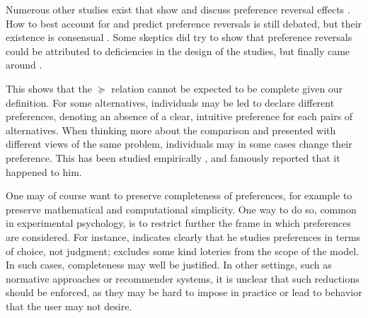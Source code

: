 \documentclass[french, english]{llncs}
\begin{document}
Numerous other studies exist that show and discuss preference reversal effects \citetext{\citealp[Ch. 2 (from which we took the two studies described here above)]{deparis_etude_2012}, \citealp{lichtenstein_construction_2006, tversky_causes_1990, kahneman_judgement_1981, kahneman_choices_2000}}. How to best account for and predict preference reversals is still debated, but their existence is consensual \citep{wakker_prospect_2010, birnbaum_empirical_2017}. Some skeptics did try to show that preference reversals could be attributed to deficiencies in the design of the studies, but finally came around \citep{slovic_preference_1983}.
	
This shows that the $\succeq$ relation cannot be expected to be complete given our definition. For some alternatives, individuals may be led to declare different preferences, denoting an absence of a clear, intuitive preference for each pairs of alternatives. When thinking more about the comparison and presented with different views of the same problem, individuals may in some cases change their preference. This has been studied empirically \citep{slovic_who_1974, maccrimmon_utility_1979, lichtenstein_reversals_2006}, and \citet[pp. 101–103]{savage_foundations_1972} famously reported that it happened to him.

One may of course want to preserve completeness of preferences, for example to preserve mathematical and computational simplicity. One way to do so, common in experimental psychology, is to restrict further the frame in which preferences are considered. For instance, \citet{luce_utility_2000} indicates clearly that he studies preferences in terms of choice, not judgment; \citet{maccrimmon_real_1980} excludes some kind loteries from the scope of the model. In such cases, completeness may well be justified. 
In other settings, such as normative approaches or recommender systems, it is unclear that such reductions should be enforced, as they may be hard to impose in practice or lead to behavior that the user may not desire. 
	
\end{document}
